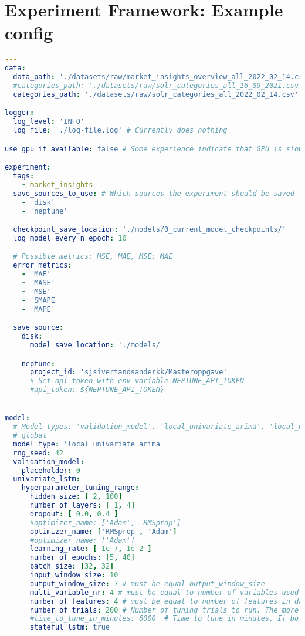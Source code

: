 
\section{Experiment Framework: Example config}
\label{cha:experiment-framework-example-config}
\begin{lstlisting}[language=yaml]
---
data:
  data_path: './datasets/raw/market_insights_overview_all_2022_02_14.csv'
  #categories_path: './datasets/raw/solr_categories_all_16_09_2021.csv'
  categories_path: './datasets/raw/solr_categories_all_2022_02_14.csv'

logger:
  log_level: 'INFO'
  log_file: './log-file.log' # Currently does nothing

use_gpu_if_available: false # Some experience indicate that GPU is slower

experiment:
  tags:
    - market_insights
  save_sources_to_use: # Which sources the experiment should be saved to
    - 'disk'
    - 'neptune'

  checkpoint_save_location: './models/0_current_model_checkpoints/'
  log_model_every_n_epoch: 10

  # Possible metrics: MSE, MAE, MSE; MAE
  error_metrics:
    - 'MAE'
    - 'MASE'
    - 'MSE'
    - 'SMAPE'
    - 'MAPE'

  save_source:
    disk:
      model_save_location: './models/'

    neptune:
      project_id: 'sjsivertandsanderkk/Masteroppgave'
      # Set api token with env variable NEPTUNE_API_TOKEN
      #api_token: ${NEPTUNE_API_TOKEN}


model:
  # Model types: 'validation_model'. 'local_univariate_arima', 'local_univariate_lstm', 'local_cnn_ae', 'local_cnn_ae_lstm'
  # global
  model_type: 'local_univariate_arima'
  rng_seed: 42
  validation_model:
    placeholder: 0
  univariate_lstm:
    hyperparameter_tuning_range:
      hidden_size: [ 2, 100]
      number_of_layers: [ 1, 4]
      dropout: [ 0.0, 0.4 ]
      #optimizer_name: ['Adam', 'RMSprop']
      optimizer_name: ['RMSprop', 'Adam']
      #optimizer_name: ['Adam']
      learning_rate: [ 1e-7, 1e-2 ]
      number_of_epochs: [5, 40]
      batch_size: [32, 32]
      input_window_size: 10
      output_window_size: 7 # must be equal output_window_size
      multi_variable_nr: 4 # must be equal to number of variables used in multi variable (1 if uni variate)
      number_of_features: 4 # must be equal to number of features in data
      number_of_trials: 200 # Number of tuning trials to run. The more the better.
      #time_to_tune_in_minutes: 6000  # Time to tune in minutes, If both number of trials or time to tune is set, first one to finnish.
      stateful_lstm: true


\end{lstlisting}
